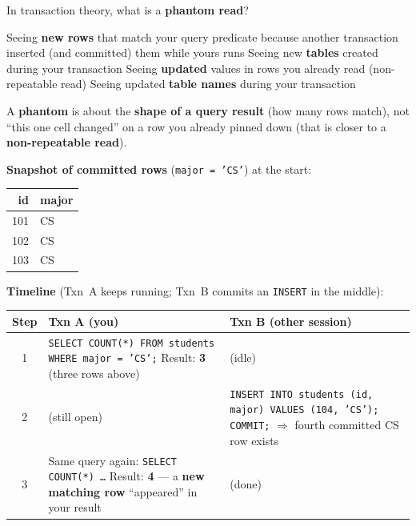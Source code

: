 \question[4]
In transaction theory, what is a \textbf{phantom read}?
\begin{choices}
  \CorrectChoice Seeing \textbf{new rows} that match your query predicate because another transaction inserted (and committed) them while yours runs
  \choice Seeing new \textbf{tables} created during your transaction
  \choice Seeing \textbf{updated} values in rows you already read (non-repeatable read)
  \choice Seeing updated \textbf{table names} during your transaction
\end{choices}
\begin{solution}
  A \textbf{phantom} is about the \textbf{shape of a query result} (how many rows match), not ``this one cell changed'' on a row you already pinned down (that is closer to a \textbf{non-repeatable read}).

  \medskip
  \noindent\textbf{Snapshot of committed rows} (\texttt{major = 'CS'}) at the start:

  \begin{center}
  \footnotesize
  \begin{tabular}{|r|l|}
    \hline
    \textbf{id} & \textbf{major} \\
    \hline
    101 & CS \\
    102 & CS \\
    103 & CS \\
    \hline
  \end{tabular}
  \end{center}

  \noindent\textbf{Timeline} (Txn~A keeps running; Txn~B commits an \texttt{INSERT} in the middle):

  \begin{center} 
  \footnotesize
  \renewcommand{\arraystretch}{1.15}
  \begin{tabular}{|c|p{}|p{}|}
    \hline
    \textbf{Step} & \textbf{Txn A (you)} & \textbf{Txn B (other session)} \\
    \hline
    1 &
    \texttt{SELECT COUNT(*) FROM students WHERE major = 'CS';}\newline
    Result: \textbf{3} (three rows above) &
    (idle) \\
    \hline
    2 &
    (still open) &
    \texttt{INSERT INTO students (id, major) VALUES (104, 'CS');}\newline
    \texttt{COMMIT;} $\Rightarrow$ fourth committed CS row exists \\
    \hline
    3 &
    Same query again:\newline
    \texttt{SELECT COUNT(*) \ldots}\newline
    Result: \textbf{4} --- a \textbf{new matching row} ``appeared'' in your result &
    (done) \\
    \hline
  \end{tabular}
  \renewcommand{\arraystretch}{1}
  \end{center}


\end{solution}
